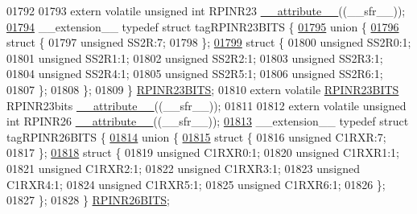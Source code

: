 \begin{DoxyCode}
01792 
01793 \textcolor{keyword}{extern} \textcolor{keyword}{volatile} \textcolor{keywordtype}{unsigned} \textcolor{keywordtype}{int}  RPINR23 \hyperlink{a00009_a493c46f03454991ccc5aa7a6e1dfb2a7}{\_\_attribute\_\_}((\_\_sfr\_\_));
\hypertarget{a00009_source_l01794}{}\hyperlink{a00008}{01794} \_\_extension\_\_ \textcolor{keyword}{typedef} \textcolor{keyword}{struct }tagRPINR23BITS \{
\hypertarget{a00009_source_l01795}{}\hyperlink{a00009}{01795}   \textcolor{keyword}{union }\{
\hypertarget{a00009_source_l01796}{}\hyperlink{a00009}{01796}     \textcolor{keyword}{struct }\{
01797       \textcolor{keywordtype}{unsigned} SS2R:7;
01798     \};
\hypertarget{a00009_source_l01799}{}\hyperlink{a00009}{01799}     \textcolor{keyword}{struct }\{
01800       \textcolor{keywordtype}{unsigned} SS2R0:1;
01801       \textcolor{keywordtype}{unsigned} SS2R1:1;
01802       \textcolor{keywordtype}{unsigned} SS2R2:1;
01803       \textcolor{keywordtype}{unsigned} SS2R3:1;
01804       \textcolor{keywordtype}{unsigned} SS2R4:1;
01805       \textcolor{keywordtype}{unsigned} SS2R5:1;
01806       \textcolor{keywordtype}{unsigned} SS2R6:1;
01807     \};
01808   \};
01809 \} \hyperlink{a00008_d3/d3b/a00715}{RPINR23BITS};
01810 \textcolor{keyword}{extern} \textcolor{keyword}{volatile} \hyperlink{a00008_d3/d3b/a00715}{RPINR23BITS} RPINR23bits \hyperlink{a00009_a493c46f03454991ccc5aa7a6e1dfb2a7}{\_\_attribute\_\_}((\_\_sfr\_\_));
01811 
01812 \textcolor{keyword}{extern} \textcolor{keyword}{volatile} \textcolor{keywordtype}{unsigned} \textcolor{keywordtype}{int}  RPINR26 \hyperlink{a00009_a493c46f03454991ccc5aa7a6e1dfb2a7}{\_\_attribute\_\_}((\_\_sfr\_\_));
\hypertarget{a00009_source_l01813}{}\hyperlink{a00008}{01813} \_\_extension\_\_ \textcolor{keyword}{typedef} \textcolor{keyword}{struct }tagRPINR26BITS \{
\hypertarget{a00009_source_l01814}{}\hyperlink{a00009}{01814}   \textcolor{keyword}{union }\{
\hypertarget{a00009_source_l01815}{}\hyperlink{a00009}{01815}     \textcolor{keyword}{struct }\{
01816       \textcolor{keywordtype}{unsigned} C1RXR:7;
01817     \};
\hypertarget{a00009_source_l01818}{}\hyperlink{a00009}{01818}     \textcolor{keyword}{struct }\{
01819       \textcolor{keywordtype}{unsigned} C1RXR0:1;
01820       \textcolor{keywordtype}{unsigned} C1RXR1:1;
01821       \textcolor{keywordtype}{unsigned} C1RXR2:1;
01822       \textcolor{keywordtype}{unsigned} C1RXR3:1;
01823       \textcolor{keywordtype}{unsigned} C1RXR4:1;
01824       \textcolor{keywordtype}{unsigned} C1RXR5:1;
01825       \textcolor{keywordtype}{unsigned} C1RXR6:1;
01826     \};
01827   \};
01828 \} \hyperlink{a00008_dc/d8f/a00718}{RPINR26BITS};

\end{DoxyCode}
